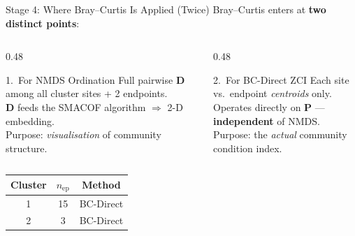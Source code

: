 \documentclass[aspectratio=169, 11pt]{beamer}
\newcommand{\mat}[1]{\mathbf{#1}}
\begin{document}
\begin{frame}{Stage 4: Where Bray--Curtis Is Applied (Twice)}
  Bray--Curtis enters at \textbf{two distinct points}:

  \vspace{0.3em}
  \begin{columns}[T]
    \begin{column}{0.48\textwidth}
      \begin{block}{1.\ For NMDS Ordination}
        Full pairwise $\mat{D}$ among all cluster sites + 2 endpoints.\\
        $\mat{D}$ feeds the SMACOF algorithm $\Rightarrow$ 2-D embedding.\\
        \smallskip
        {\small Purpose: \emph{visualisation} of community structure.}
      \end{block}
    \end{column}
    \begin{column}{0.48\textwidth}
      \begin{block}{2.\ For BC-Direct ZCI}
        Each site vs.\ endpoint \emph{centroids} only.\\
        Operates directly on $\mat{P}$ --- \textbf{independent} of NMDS.\\
        \smallskip
        {\small Purpose: the \emph{actual} community condition index.}
      \end{block}
    \end{column}
  \end{columns}

  \vspace{0.5em}
  \begin{center}\small
  \begin{tabular}{ccc}
    \toprule
    Cluster & $n_{\text{ep}}$ & Method \\
    \midrule
    1 & 15 & BC-Direct \\
    2 & 3  & BC-Direct \\
    \bottomrule
  \end{tabular}
  \end{center}
\end{frame}
\end{document}
